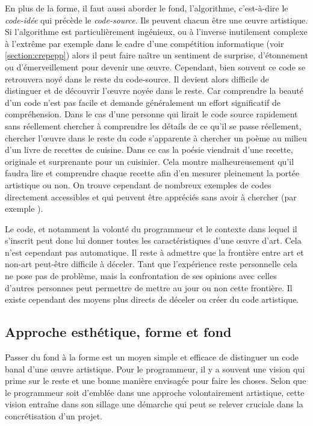 \documentclass[12pt]{article} %
\begin{document}
En plus de la forme, il faut aussi aborder le fond, l'algorithme, c'est-à-dire le \textit{code-idée} qui précède le \textit{code-source}. Ils peuvent chacun être une œuvre artistique. Si l'algorithme est particulièrement ingénieux, ou à l'inverse inutilement complexe à l'extrême par exemple dans le cadre d'une compétition informatique (voir \ref{section:crepepp}) alors il peut faire naître un sentiment de surprise, d'étonnement ou d'émerveillement pour devenir une œuvre. Cependant, bien souvent ce code se retrouvera noyé dans le reste du code-source. Il devient alors difficile de distinguer et de découvrir l'œuvre noyée dans le reste. Car comprendre la beauté d'un code n'est pas facile et demande généralement un effort significatif de compréhension. Dans le cas d'une personne qui lirait le code source rapidement sans réellement chercher à comprendre les détails de ce qu'il se passe réellement, chercher l'œuvre dans le reste du code s'apparente à chercher un poème au milieu d'un livre de recettes de cuisine. Dans ce cas la poésie viendrait d'une recette, originale et surprenante pour un cuisinier. Cela montre malheureusement qu'il faudra lire et comprendre chaque recette afin d'en mesurer pleinement la portée artistique ou non. On trouve cependant de nombreux exemples de codes directement accessibles et qui peuvent être appréciés sans avoir à chercher (par exemple \cite{MEnriqueBermudez-ObfuscatedCCode}).

Le code, et notamment la volonté du programmeur et le contexte dans lequel il s'inscrit peut donc lui donner toutes les caractéristiques d'une œuvre d'art. Cela n'est cependant pas automatique. Il reste à admettre que la frontière entre art et non-art peut-être difficile à déceler. Tant que l'expérience reste personnelle cela ne pose pas de problème, mais la confrontation de ses opinions avec celles d'autres personnes peut permettre de mettre au jour ou non cette frontière. Il existe cependant des moyens plus directs de déceler ou créer du code artistique.

\subsection{Approche esthétique, forme et fond} %
Passer du fond à la forme est un moyen simple et efficace de distinguer un code banal d'une œuvre artistique. Pour le programmeur, il y a souvent une vision qui prime sur le reste et une bonne manière envisagée pour faire les choses. Selon que le programmeur soit d'emblée dans une approche volontairement artistique, cette vision entraîne dans son sillage une démarche qui peut se relever cruciale dans la concrétisation d'un projet.
\end{document}
